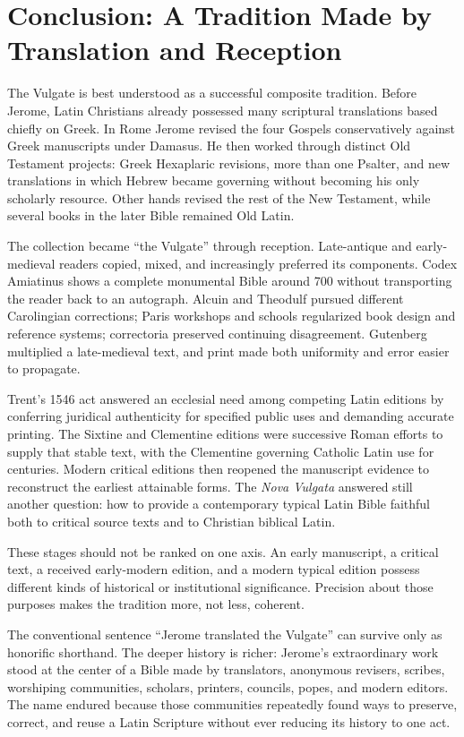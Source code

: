 \section{Conclusion: A Tradition Made by Translation and Reception}

The Vulgate is best understood as a successful composite tradition. Before Jerome, Latin Christians already possessed many scriptural translations based chiefly on Greek. In Rome Jerome revised the four Gospels conservatively against Greek manuscripts under Damasus. He then worked through distinct Old Testament projects: Greek Hexaplaric revisions, more than one Psalter, and new translations in which Hebrew became governing without becoming his only scholarly resource. Other hands revised the rest of the New Testament, while several books in the later Bible remained Old Latin.

The collection became ``the Vulgate'' through reception. Late-antique and early-medieval readers copied, mixed, and increasingly preferred its components. Codex Amiatinus shows a complete monumental Bible around 700 without transporting the reader back to an autograph. Alcuin and Theodulf pursued different Carolingian corrections; Paris workshops and schools regularized book design and reference systems; correctoria preserved continuing disagreement. Gutenberg multiplied a late-medieval text, and print made both uniformity and error easier to propagate.

Trent's 1546 act answered an ecclesial need among competing Latin editions by conferring juridical authenticity for specified public uses and demanding accurate printing. The Sixtine and Clementine editions were successive Roman efforts to supply that stable text, with the Clementine governing Catholic Latin use for centuries. Modern critical editions then reopened the manuscript evidence to reconstruct the earliest attainable forms. The \emph{Nova Vulgata} answered still another question: how to provide a contemporary typical Latin Bible faithful both to critical source texts and to Christian biblical Latin.

These stages should not be ranked on one axis. An early manuscript, a critical text, a received early-modern edition, and a modern typical edition possess different kinds of historical or institutional significance. Precision about those purposes makes the tradition more, not less, coherent.

The conventional sentence ``Jerome translated the Vulgate'' can survive only as honorific shorthand. The deeper history is richer: Jerome's extraordinary work stood at the center of a Bible made by translators, anonymous revisers, scribes, worshiping communities, scholars, printers, councils, popes, and modern editors. The name endured because those communities repeatedly found ways to preserve, correct, and reuse a Latin Scripture without ever reducing its history to one act.
